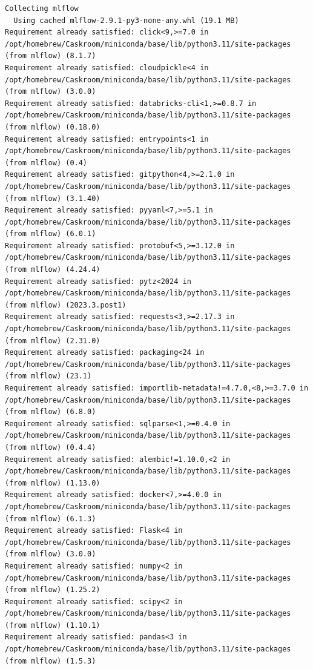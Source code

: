 \documentclass[
  letterpaper,
  DIV=11,
  numbers=noendperiod]{scrartcl}
\begin{document}
\begin{verbatim}
Collecting mlflow
  Using cached mlflow-2.9.1-py3-none-any.whl (19.1 MB)
Requirement already satisfied: click<9,>=7.0 in /opt/homebrew/Caskroom/miniconda/base/lib/python3.11/site-packages (from mlflow) (8.1.7)
Requirement already satisfied: cloudpickle<4 in /opt/homebrew/Caskroom/miniconda/base/lib/python3.11/site-packages (from mlflow) (3.0.0)
Requirement already satisfied: databricks-cli<1,>=0.8.7 in /opt/homebrew/Caskroom/miniconda/base/lib/python3.11/site-packages (from mlflow) (0.18.0)
Requirement already satisfied: entrypoints<1 in /opt/homebrew/Caskroom/miniconda/base/lib/python3.11/site-packages (from mlflow) (0.4)
Requirement already satisfied: gitpython<4,>=2.1.0 in /opt/homebrew/Caskroom/miniconda/base/lib/python3.11/site-packages (from mlflow) (3.1.40)
Requirement already satisfied: pyyaml<7,>=5.1 in /opt/homebrew/Caskroom/miniconda/base/lib/python3.11/site-packages (from mlflow) (6.0.1)
Requirement already satisfied: protobuf<5,>=3.12.0 in /opt/homebrew/Caskroom/miniconda/base/lib/python3.11/site-packages (from mlflow) (4.24.4)
Requirement already satisfied: pytz<2024 in /opt/homebrew/Caskroom/miniconda/base/lib/python3.11/site-packages (from mlflow) (2023.3.post1)
Requirement already satisfied: requests<3,>=2.17.3 in /opt/homebrew/Caskroom/miniconda/base/lib/python3.11/site-packages (from mlflow) (2.31.0)
Requirement already satisfied: packaging<24 in /opt/homebrew/Caskroom/miniconda/base/lib/python3.11/site-packages (from mlflow) (23.1)
Requirement already satisfied: importlib-metadata!=4.7.0,<8,>=3.7.0 in /opt/homebrew/Caskroom/miniconda/base/lib/python3.11/site-packages (from mlflow) (6.8.0)
Requirement already satisfied: sqlparse<1,>=0.4.0 in /opt/homebrew/Caskroom/miniconda/base/lib/python3.11/site-packages (from mlflow) (0.4.4)
Requirement already satisfied: alembic!=1.10.0,<2 in /opt/homebrew/Caskroom/miniconda/base/lib/python3.11/site-packages (from mlflow) (1.13.0)
Requirement already satisfied: docker<7,>=4.0.0 in /opt/homebrew/Caskroom/miniconda/base/lib/python3.11/site-packages (from mlflow) (6.1.3)
Requirement already satisfied: Flask<4 in /opt/homebrew/Caskroom/miniconda/base/lib/python3.11/site-packages (from mlflow) (3.0.0)
Requirement already satisfied: numpy<2 in /opt/homebrew/Caskroom/miniconda/base/lib/python3.11/site-packages (from mlflow) (1.25.2)
Requirement already satisfied: scipy<2 in /opt/homebrew/Caskroom/miniconda/base/lib/python3.11/site-packages (from mlflow) (1.10.1)
Requirement already satisfied: pandas<3 in /opt/homebrew/Caskroom/miniconda/base/lib/python3.11/site-packages (from mlflow) (1.5.3)

\end{verbatim}
\end{document}
